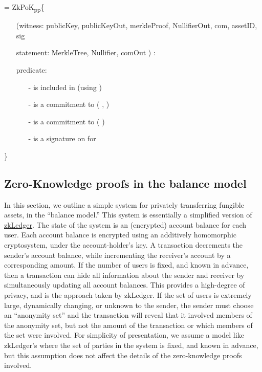  = ZkPoK\textsubscript{pp}\{  
\begin{itemize}
\item[] (witness: publicKey, publicKeyOut, merkleProof, NullifierOut, com, assetID, sig
\item[] statement: MerkleTree, Nullifier, comOut ) :  
\item[] predicate: 
		\begin{itemize} 
			\item[-]  is included in  (using )
			\item[-]  is a commitment to ( ,  )
			\item[-]  is a commitment to (  )
			\item[-]  is a signature on  for 
		\end{itemize}
\end{itemize}
\}



\subsection{Zero-Knowledge proofs in the balance model}

In this section, we outline a simple system for privately transferring fungible assets, in the “balance model.”  This system is essentially a simplified version of \href{https://www.usenix.org/system/files/conference/nsdi18/nsdi18-narula.pdf}{zkLedger}.  The state of the system is an (encrypted) account balance for each user.  Each account balance is encrypted using an additively homomorphic cryptosystem, under the account-holder’s key.  A transaction decrements the sender’s account balance, while incrementing the receiver’s account by a corresponding amount.  If the number of users is fixed, and known in advance, then a transaction can hide all information about the sender and receiver by simultaneously updating all account balances.  This provides a high-degree of privacy, and is the approach taken by zkLedger.  If the set of users is extremely large, dynamically changing, or unknown to the sender, the sender must choose an “anonymity set” and the transaction will reveal that it involved members of the anonymity set, but not the amount of the transaction or which members of the set were involved.  For simplicity of presentation, we assume a model like zkLedger’s where the set of parties in the system is fixed, and known in advance, but this assumption does not affect the details of the zero-knowledge proofs involved.

